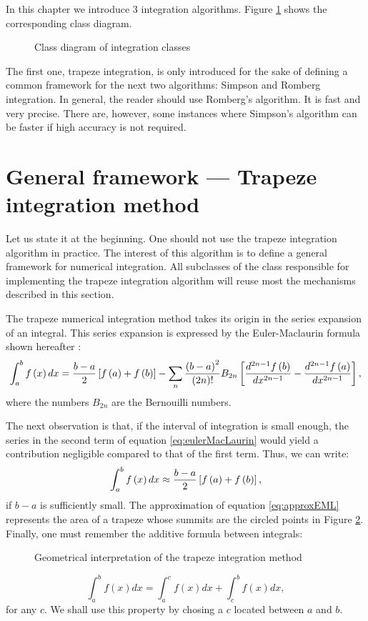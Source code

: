 \documentclass[twoside]{book}
\begin{document}
In this chapter we introduce 3 integration algorithms. Figure
\ref{fig:integclass} shows the corresponding class diagram.
\begin{figure}
\center{}
\caption{Class diagram of integration
classes}\label{fig:integclass}
\end{figure}
The first one, trapeze integration, is only introduced for the
sake of defining a common framework for the next two algorithms:
Simpson and Romberg integration. In general, the reader should use
Romberg's algorithm. It is fast and very precise. There are,
however, some instances where Simpson's algorithm can be faster if
high accuracy is not required.

\section{General framework --- Trapeze integration method}
\label{sec:trapeze} Let us state it at the beginning. One should
not use the trapeze integration algorithm in practice. The
interest of this algorithm is to define a general framework for
numerical integration. All subclasses of the class responsible for
implementing the trapeze integration algorithm will reuse most the
mechanisms described in this section.

The trapeze numerical integration method takes its origin in the
series expansion of an integral. This series expansion is
expressed by the Euler-Maclaurin formula shown hereafter
\cite{Bass}:
\begin{equation}
\label{eq:eulerMacLaurin}
  \int_a^b f\left(x\right)dx={b-a\over
  2}\left[f\left(a\right)+f\left(b\right)\right]-\sum_n{\left(b-a\right)^2\over
  \left(2n\right)!}B_{2n}\left[{d^{2n-1}f\left(b\right)\over dx^{2n-1}}-{d^{2n-1}f\left(a\right)\over
  dx^{2n-1}}\right],
\end{equation}
where the numbers $B_{2n}$ are the Bernouilli numbers.

The next observation is that, if the interval of integration is
small enough, the series in the second term of equation
\ref{eq:eulerMacLaurin} would yield a contribution negligible
compared to that of the first term. Thus, we can write:
\begin{equation}
\label{eq:approxEML}
  \int_a^b f\left(x\right)dx\approx{b-a\over
  2}\left[f\left(a\right)+f\left(b\right)\right],
\end{equation}
if $b-a$ is sufficiently small. The approximation of equation
\ref{eq:approxEML} represents the area of a trapeze whose summits
are the circled points in Figure \ref{fig:trapeze}. Finally, one
must remember the additive formula between integrals:
\begin{figure}
\center{}
\caption{Geometrical interpretation of the trapeze integration
method}\label{fig:trapeze}
\end{figure}
\begin{equation}
\label{eq:addintegral}
  \int_a^b f\left(x\right)dx=\int_a^c f\left(x\right)dx+\int_c^b f\left(x\right)dx,
\end{equation}
for any $c$. We shall use this property by chosing a $c$ located
between $a$ and $b$.
\end{document}
